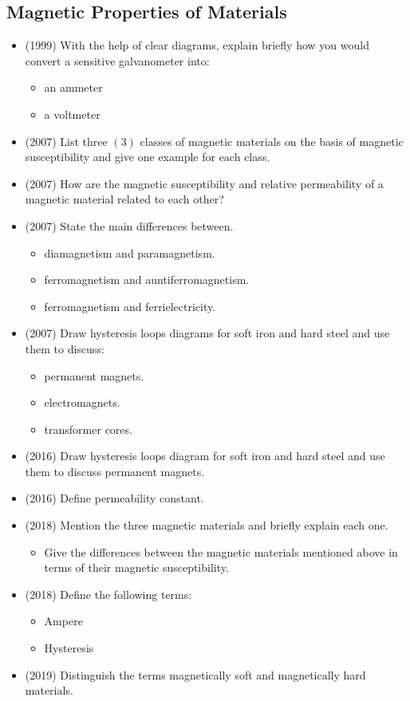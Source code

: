 \documentclass{article}
\begin{document}
\subsection{Magnetic Properties of Materials}
\begin{itemize}
\item (1999)  With the help of clear diagrams, explain briefly how you would convert a sensitive galvanometer into:
 \begin{itemize}
\item an ammeter
\item a voltmeter
\end{itemize}
\item (2007)  List three $ (3)$ classes of magnetic materials on the basis of magnetic susceptibility and give one example for each class.
\item (2007)  How are the magnetic susceptibility and relative permeability of a magnetic material related to each other?
\item (2007)  State the main differences between.
 \begin{itemize}
\item diamagnetism and paramagnetism. 
\item ferromagnetism and auntiferromagnetism. 
\item ferromagnetism and ferrielectricity. 
\end{itemize}
\item (2007)  Draw hysteresis loops diagrams for soft iron and hard steel and use them to discuss:
 \begin{itemize}
\item permanent magnets.
\item electromagnets.
\item transformer cores. 
\end{itemize}
\item (2016)  Draw hysteresis loops diagram for soft iron and hard steel and use them to discuss permanent magnets.
\item (2016)  Define permeability constant.
\item (2018)  Mention the three magnetic materials and briefly explain each one. 
 \begin{itemize}
\item Give the differences between the magnetic materials mentioned above in terms of their magnetic susceptibility. 
\end{itemize}
\item (2018)  Define the following terms:
 \begin{itemize}
\item Ampere 
\item Hysteresis 
\end{itemize}
\item (2019)  Distinguish the terms magnetically soft and magnetically hard materials.
\end{itemize}
\end{document}
